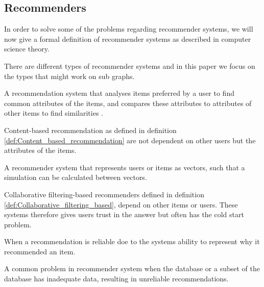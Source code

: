 \subsection{Recommenders}
In order to solve some of the problems regarding recommender systems, we will now give a formal definition of recommender systems as described in computer science theory. 

There are different types of recommender systems and in this paper we focus on the types that might work on sub graphs.

\begin{definition} \label{def:Content_based_recommendation}
A recommendation system that analyses items preferred by a user to find common attributes of the items, and compares these attributes to attributes of other items to find similarities \cite{lu2015recommender}. 
\end{definition}

Content-based recommendation as defined in definition  \ref{def:Content_based_recommendation} are not dependent on other users but the attributes of the items.

\begin{definition}\label{def:Collaborative_filtering_based}
A recommender system that represents users or items as vectors, such that a simulation can be calculated between vectors\cite{lu2015recommender}.
\end{definition}

Collaborative filtering-based recommenders defined in definition \ref{def:Collaborative_filtering_based}, depend on other items or users. These systems therefore gives users trust in the answer but often has the cold start problem.

\begin{definition}[Trust]\label{def:trust}
When a recommendation is reliable doe to the systems ability to represent why it recommended an item.
\end{definition}

\begin{definition}\label{def:cold_start_problem}
A common problem in recommender system when the database or a subset of the database has inadequate data, resulting in unreliable recommendations.
\end{definition}